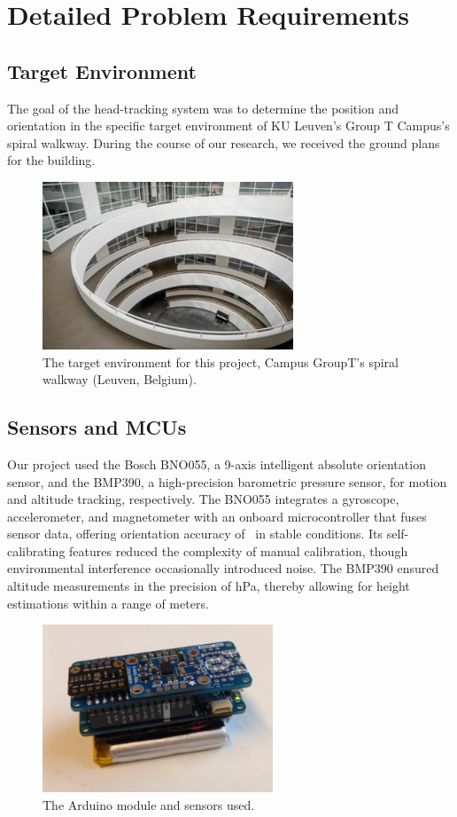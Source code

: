 \chapter{Detailed Problem Requirements}
\section{Target Environment}

The goal of the head-tracking system was to determine the position and orientation in the specific target environment of KU Leuven's Group T Campus's spiral walkway. During the course of our research, we received the ground plans for the building.

\begin{figure}[h] 
	\centering \includegraphics[height=5cm]{./images/spiral_groupt.jpg}
	\caption{The target environment for this project, Campus GroupT's spiral walkway (Leuven, Belgium).}
\end{figure}

\section{Sensors and MCUs}

Our project used the Bosch BNO055, a 9-axis intelligent absolute orientation sensor, and the BMP390, a high-precision barometric pressure sensor, for motion and altitude tracking, respectively. The BNO055 integrates a gyroscope, accelerometer, and magnetometer with an onboard microcontroller that fuses sensor data, offering orientation accuracy of  \textdegree \ in stable conditions.  \cite{bno055} Its self-calibrating features reduced the complexity of manual calibration, though environmental interference occasionally introduced noise. The BMP390 ensured altitude measurements in the precision of  hPa, thereby allowing for height estimations within a range of  meters. \cite{bmp390}

\begin{figure}[h] 
	\centering \includegraphics[height=5cm]{./images/hamburger.png}
	\caption{The Arduino module and sensors used.}
\end{figure}